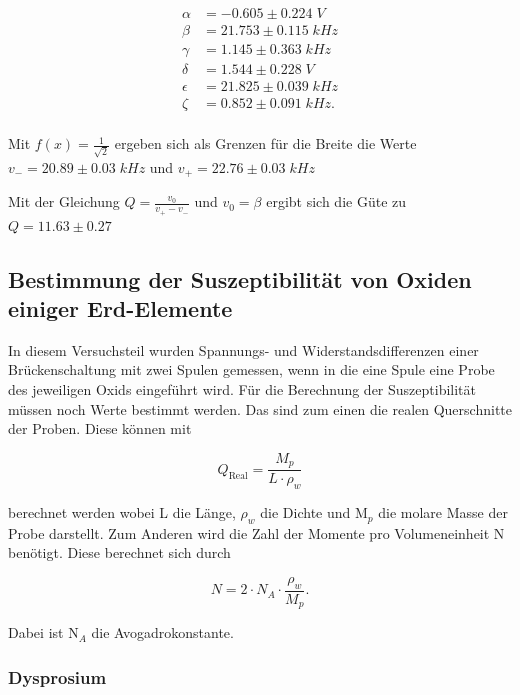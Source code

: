 \begin{align*}
    \alpha &=   -0.605 \pm 0.224 \; V \\
    \beta &=   21.753 \pm 0.115 \; kHz \\
    \gamma &=    1.145 \pm 0.363 \; kHz \\
    \delta &=    1.544 \pm 0.228 \; V \\
    \epsilon &=   21.825 \pm 0.039 \; kHz \\
    \zeta &=    0.852 \pm 0.091 \; kHz. \\
\end{align*}

\noindent Mit $ f(x) = \frac{1}{\sqrt{2}} $ ergeben sich als Grenzen für die Breite die Werte $v_- = 20.89 \pm 0.03 \; kHz$ und $v_+ = 22.76 \pm 0.03 \; kHz$

\noindent Mit der Gleichung $Q = \frac{v_0}{v_+ - v_-}$ und $v_0 = \beta$ ergibt sich die Güte zu $Q = 11.63\pm 0.27$

\subsection{Bestimmung der Suszeptibilität von Oxiden einiger Erd-Elemente}

In diesem Versuchsteil wurden Spannungs- und Widerstandsdifferenzen einer Brückenschaltung mit zwei Spulen gemessen, wenn in die eine Spule eine Probe des jeweiligen Oxids eingeführt wird. Für die Berechnung der Suszeptibilität müssen noch Werte bestimmt werden. Das sind zum einen die realen Querschnitte der Proben. Diese können mit 

\begin{equation*}
    Q_\text{Real} = \frac{M_p}{L\cdot \rho_w}
\end{equation*}

\noindent berechnet werden wobei L die Länge, $\rho_w$ die Dichte und M$_p$ die molare Masse der Probe darstellt. 
Zum Anderen wird die Zahl der Momente pro Volumeneinheit N benötigt. Diese berechnet sich durch

\begin{equation*}
    N = 2 \cdot N_A \cdot \frac{\rho_w}{M_p}.
\end{equation*}

\noindent Dabei ist N$_A$ die Avogadrokonstante.

\subsubsection{Dysprosium}

